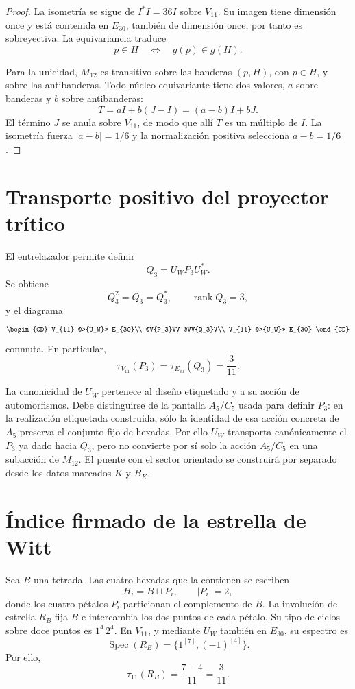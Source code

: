 \begin{proof}
La isometría se sigue de \(I^*I=36I\) sobre \(V_{11}\). Su imagen tiene
dimensión once y está contenida en \(E_{30}\), también de dimensión once;
por tanto es sobreyectiva. La equivariancia traduce
\[
 p\in H\quad\Longleftrightarrow\quad g(p)\in g(H).
\]

Para la unicidad, \(M_{12}\) es transitivo sobre las banderas
\((p,H)\), con \(p\in H\), y sobre las antibanderas. Todo núcleo
equivariante tiene dos valores, \(a\) sobre banderas y \(b\) sobre
antibanderas:
\[
 T=aI+b(J-I)=(a-b)I+bJ.
\]
El término \(J\) se anula sobre \(V_{11}\), de modo que allí \(T\) es un
múltiplo de \(I\). La isometría fuerza \(|a-b|=1/6\) y la normalización
positiva selecciona \(a-b=1/6\).
\end{proof}

\section{Transporte positivo del proyector trítico}

El entrelazador permite definir
\[
 \boxed{Q_3=U_WP_3U_W^*.}
\]
Se obtiene
\[
 Q_3^2=Q_3=Q_3^*,
 \qquad
 \operatorname{rank}Q_3=3,
\]
y el diagrama
\[
\begin{CD}
V_{11} @>{U_W}>> E_{30}\\
@V{P_3}VV @VV{Q_3}V\\
V_{11} @>{U_W}>> E_{30}
\end{CD}
\]
conmuta. En particular,
\[
 \boxed{\tau_{V_{11}}(P_3)=\tau_{E_{30}}(Q_3)=\frac3{11}.}
\]

La canonicidad de \(U_W\) pertenece al diseño etiquetado y a su acción de
automorfismos. Debe distinguirse de la pantalla \(A_5/C_5\) usada para
definir \(P_3\): en la realización etiquetada construida, sólo la identidad
de esa acción concreta de \(A_5\) preserva el conjunto fijo de hexadas. Por
ello \(U_W\) transporta canónicamente el \(P_3\) ya dado hacia
\(Q_3\), pero no convierte por sí solo la acción \(A_5/C_5\) en una
subacción de \(M_{12}\). El puente con el sector orientado se construirá por separado
desde los datos marcados \(K\) y \(B_K\).

\section{Índice firmado de la estrella de Witt}

Sea \(B\) una tetrada. Las cuatro hexadas que la contienen se escriben
\[
 H_i=B\sqcup P_i,\qquad |P_i|=2,
\]
donde los cuatro pétalos \(P_i\) particionan el complemento de \(B\).
La involución de estrella \(R_B\) fija \(B\) e intercambia los dos puntos
de cada pétalo. Su tipo de ciclos sobre doce puntos es \(1^4\,2^4\). En
\(V_{11}\), y mediante \(U_W\) también en \(E_{30}\), su espectro es
\[
 \operatorname{Spec}(R_B)=\{1^{[7]},(-1)^{[4]}\}.
\]
Por ello,
\[
 \boxed{\tau_{11}(R_B)=\frac{7-4}{11}=\frac3{11}.}
\]

